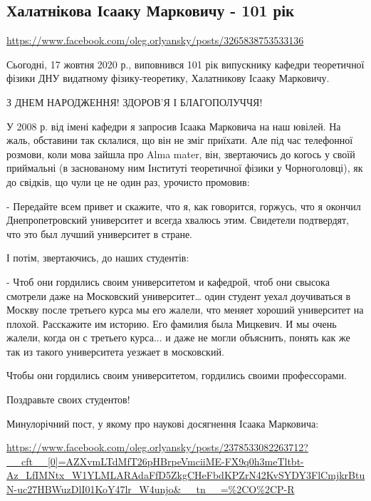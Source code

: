  
 

\subsection{Халатнікова Ісааку Марковичу - 101 рік}

\url{https://www.facebook.com/oleg.orlyansky/posts/3265838753533136}


Сьогодні, 17 жовтня 2020 р., виповнився 101 рік випускнику кафедри теоретичної
фізики ДНУ видатному фізику-теоретику, Халатникову Ісааку Марковичу.

З ДНЕМ НАРОДЖЕННЯ! ЗДОРОВ’Я І БЛАГОПОЛУЧЧЯ! 

У 2008 р. від імені кафедри я запросив Ісаака Марковича на наш ювілей. На жаль,
обставини так склалися, що він не зміг приїхати. Але під час телефонної
розмови, коли мова зайшла про Alma mater, він, звертаючись до когось у своїй
приймальні (в заснованому ним Інституті теоретичної фізики у Чорноголовці), як
до свідків, що чули це не один раз, урочисто промовив:

- Передайте всем привет и скажите, что я, как говорится, горжусь, что я окончил
Днепропетровский университет и всегда хвалюсь этим. Свидетели подтвердят, что
это был лучший университет в стране.

І потім, звертаючись, до наших студентів:

- Чтоб они гордились своим университетом и кафедрой, чтоб они свысока смотрели
даже на Московский университет… один студент уехал доучиваться в Москву после
третьего курса мы его жалели, что меняет хороший университет на плохой.
Расскажите им историю. Его фамилия была Мицкевич. И мы очень жалели, когда он с
третьего курса... и даже не могли объяснить, понять как же так из такого
университета уезжает в московский.

Чтобы они гордились своим университетом, гордились своими профессорами.

Поздравьте своих студентов!

Минулорічний пост, у якому  про наукові досягнення Ісаака Марковича:

\url{https://www.facebook.com/oleg.orlyansky/posts/2378533082263712?__cft__[0]=AZXvmLTdMfT26pHBrpeVmciiME-FX9q0h3meTltbt-Az_LfIMNtx_W1YLMLARAdaFfD5ZkgCHeFbdKPZrN42KvSYDY3FlCmjkrBtuN-uc27HBWuzDlI01KoY47lr_W4unjo&__tn__=%2CO%2CP-R}

